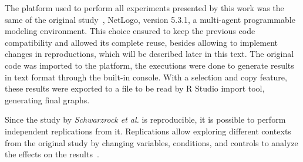 The platform used to perform all experiments presented by this work was the same of the original study~\citep{MAS07}, NetLogo, version 5.3.1, a multi-agent programmable modeling environment. This choice ensured to keep the previous code compatibility and allowed its complete reuse, besides allowing to implement changes in reproductions, which will be described later in this text. The original code was imported to the platform, the executions were done to generate results in text format through the built-in console. With a selection and copy feature, these results were exported to a file to be read by R Studio import tool, generating final graphs.  



Since the study by \textit{Schwarzrock et al.}\citep{MAS07} is reproducible, it is possible to perform independent replications from it. Replications allow exploring different contexts from the original study  by changing variables, conditions, and controls to analyze the effects on the results~\citep{exp03}. 
